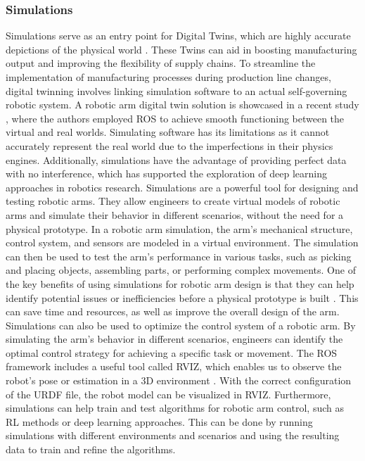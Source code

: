 \documentclass[12pt,oneside]{article}
\begin{document}
\subsubsection{Simulations}
Simulations serve as an entry point for Digital Twins, which are highly accurate depictions of the physical world \cite{19_lu2020digital}. These Twins can aid in boosting manufacturing output and improving the flexibility of supply chains. To streamline the implementation of manufacturing processes during production line changes, digital twinning involves linking simulation software to an actual self-governing robotic system. A robotic arm digital twin solution is showcased in a recent study \cite{20_tavares2018flexible}, where the authors employed ROS \cite{21_ros} to achieve smooth functioning between the virtual and real worlds. Simulating software has its limitations as it cannot accurately represent the real world due to the imperfections in their physics engines. Additionally, simulations have the advantage of providing perfect data with no interference, which has supported the exploration of deep learning approaches in robotics research.
Simulations are a powerful tool for designing and testing robotic arms. They allow engineers to create virtual models of robotic arms and simulate their behavior in different scenarios, without the need for a physical prototype. In a robotic arm simulation, the arm's mechanical structure, control system, and sensors are modeled in a virtual environment. The simulation can then be used to test the arm's performance in various tasks, such as picking and placing objects, assembling parts, or performing complex movements. One of the key benefits of using simulations for robotic arm design is that they can help identify potential issues or inefficiencies before a physical prototype is built \cite{22_browning2001applying}. This can save time and resources, as well as improve the overall design of the arm. Simulations can also be used to optimize the control system of a robotic arm. By simulating the arm's behavior in different scenarios, engineers can identify the optimal control strategy for achieving a specific task or movement. 
The ROS framework includes a useful tool called RVIZ, which enables us to observe the robot's pose or estimation in a 3D environment \cite{23_kulkarni2021visual}. With the correct configuration of the URDF file, the robot model can be visualized in RVIZ.  Furthermore, simulations can help train and test algorithms for robotic arm control, such as RL methods or deep learning approaches. This can be done by running simulations with different environments and scenarios and using the resulting data to train and refine the algorithms.
\end{document}
